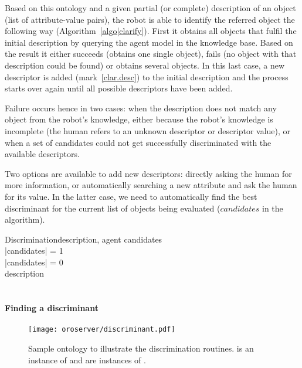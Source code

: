 Based on this ontology and a given partial (or complete) description of an
object (list of attribute-value pairs), the robot is able to identify the
referred object the following way (Algorithm~\ref{algo|clarify}). First it
obtains all objects that fulfil the initial description by querying the agent
model in the knowledge base. Based on the result it either succeeds (obtains
one single object), fails (no object with that description could be found) or
obtains several objects. In this last case, a new descriptor is added
(mark~\ref{clar.desc}) to the initial description and the process starts over
again until all possible descriptors have been added.

Failure occurs hence in two cases: when the description does not match any object
from the robot's knowledge, either because the robot's knowledge is incomplete
(the human refers to an unknown descriptor or descriptor value), or when a set of
candidates could not get successfully discriminated with the available
descriptors.

Two options are available to add new descriptors: directly asking the human for
more information, or automatically searching a new attribute and ask the human
for its value. In the latter case, we need to automatically find the best
discriminant for the current list of objects being evaluated ($candidates$ in
the algorithm).


\small
\begin{pseudocode}[ruled]{Discrimination}{description, agent}
\label{algo|clarify}
\BEGIN
candidates \GETS {} \\
\IF \left|{candidates}\right| = 1 \THEN {} \\
\ELSEIF \left|{candidates}\right| = 0 \THEN {} \\
\ELSE
    \BEGIN
        description \GETS {} \\
         \\
    \END
\END

\end{pseudocode}
\normalsize

\paragraph{Finding a discriminant}
\label{sect|discriminant}

\begin{figure}
    \centering
    \texttt{[image: oroserver/discriminant.pdf]}
    \caption{Sample ontology to illustrate the discrimination routines.
     is an instance of  and
     are instances of .}
    \label{fig|discriminant}
\end{figure}

